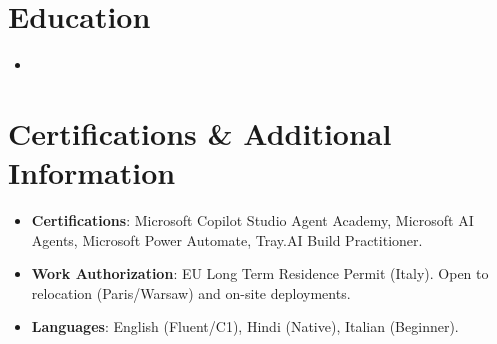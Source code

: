 \documentclass[10pt,a4paper,sans]{moderncv}
\begin{document}
\section{Education}
\vspace{1pt}
\begin{itemize}
\item{}
\end{itemize}
\vspace{3pt}

\section{Certifications \& Additional Information}
\vspace{1pt}
\begin{itemize}
\item \textbf{Certifications}: Microsoft Copilot Studio Agent Academy, Microsoft AI Agents, Microsoft Power Automate, Tray.AI Build Practitioner.
\item \textbf{Work Authorization}: EU Long Term Residence Permit (Italy). Open to relocation (Paris/Warsaw) and on-site deployments.
\item \textbf{Languages}: English (Fluent/C1), Hindi (Native), Italian (Beginner).
\end{itemize}
\end{document}
